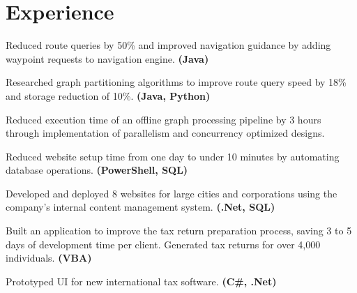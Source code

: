 \documentclass[letterpaper]{kevin-resume} %
\begin{document}
\begin{minipage}[t]{0.63\textwidth} %


\section{Experience}

\vspace{\topsep} %
\begin{tightitemize}
	\item Reduced route queries by 50\% and improved navigation guidance by adding waypoint requests to navigation engine. \textbf{(Java)}
	\item Researched graph partitioning algorithms to improve route query speed by 18\% and storage reduction of 10\%. \textbf{(Java, Python)}
	\item Reduced execution time of an offline graph processing pipeline by 3 hours through implementation of parallelism and concurrency optimized designs.
\end{tightitemize}

\sectionspace %

\begin{tightitemize}
	\item Reduced website setup time from one day to under 10 minutes by automating database operations. \textbf{(PowerShell, SQL)}
	\item Developed and deployed 8 websites for large cities and corporations using the company's internal content management system. \textbf{(.Net, SQL)}
\end{tightitemize}

\sectionspace %


\begin{tightitemize}
	\item Built an application to improve the tax return preparation process, saving 3 to 5 days of development time per client. Generated tax returns for over 4,000 individuals. \textbf{(VBA)}
	\item Prototyped UI for new international tax software. \textbf{(C\#, .Net)}
\end{tightitemize}


\end{minipage}
\end{document}
